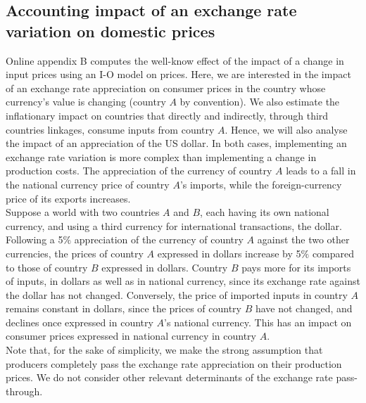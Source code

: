 \documentclass[11pt,a4paper]{paper} %
\begin{document}
\subsection{Accounting impact of an exchange rate variation on domestic prices} \label{subsec:chocchange}
Online appendix B computes  the well-know effect of the impact of a change in input prices using an I-O model on prices. 
Here, we are interested in the impact of an exchange rate appreciation on consumer prices in the country whose currency’s value is changing (country $A$ by convention). 
We also estimate the inflationary impact on countries that directly and indirectly, through third countries linkages, consume inputs from country $A$. Hence, we will also analyse the impact of an appreciation of the US dollar.
In both cases, implementing an exchange rate variation is more complex than implementing a change in production costs. 
The appreciation of the currency of country $A$ leads to a fall in the national currency price of country $A$'s imports, while the foreign-currency price of its exports increases. \\
Suppose a world with two countries $A$ and $B$, each having its own national currency, and using a third currency for international transactions, the dollar.
Following a 5$\%$ appreciation of the currency of country $A$ against the two other currencies, the prices of country $A$ expressed in dollars increase by 5$\%$ compared to those of country $B$ expressed in dollars. 
Country $B$ pays more for its imports of inputs, in dollars as well as in national currency, since its exchange rate against the dollar has not changed. 
Conversely, the price of imported inputs in country $A$ remains constant in dollars, since the prices of country $B$ have not changed, and declines once expressed in country $A$'s national currency. 
This has an impact on consumer prices expressed in national currency in country $A$.\\
Note that, for the sake of simplicity, we make the strong assumption that producers completely pass the exchange rate appreciation on their production prices.  
We do not consider other relevant determinants of the exchange rate pass-through.
\end{document}
